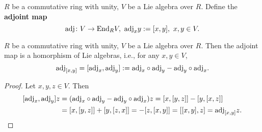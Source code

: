 \begin{definition}
  $R$ be a commutative ring with unity, $V$ be a Lie algebra over $R$.
  Define the \textbf{adjoint map}
  \begin{equation}
    {\rm adj} \colon V \to {\rm End}_R V,\
    {\rm adj}_x y := [x, y],\ x, y \in V.
  \end{equation}
\end{definition}
\begin{proposition}
  $R$ be a commutative ring with unity, $V$ be a Lie algebra over $R$.
  Then the adjoint map is a homorphism of Lie algebras, i.e.,
  for any $x, y \in V$,
  \begin{equation}
    {\rm adj}_{[x, y]}
    = [{\rm adj}_x, {\rm adj}_y]
    := {\rm adj}_x \circ {\rm adj}_y - {\rm adj}_y \circ {\rm adj}_x.
  \end{equation}
\end{proposition}
\begin{proof}
  Let $x, y, z \in V$.
  Then
  \begin{equation}
    \begin{split}
      [{\rm adj}_x, {\rm adj}_y] z
      & = ({\rm adj}_x \circ {\rm adj}_y - {\rm adj}_y \circ {\rm adj}_x) z
      = [x, [y, z]] - [y, [x, z]] \\
      & = [x, [y, z]] + [y, [z, x]]
      = - [z, [x, y]]
      = [[x, y], z]
      = {\rm adj}_{[x, y]} z.
      \qedhere
    \end{split}
  \end{equation}
\end{proof}
